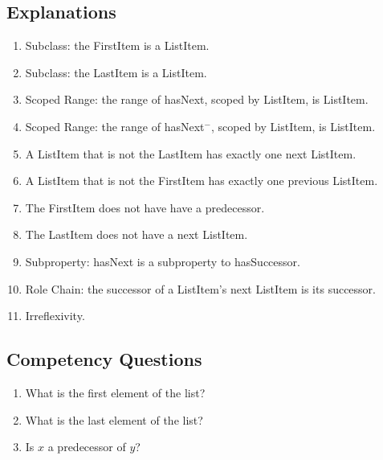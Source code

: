 \subsection{Explanations}
\label{exp:Sequence}
\begin{enumerate}
\item Subclass: the \textsf{FirstItem} is a \textsf{ListItem}.
\item Subclass: the \textsf{LastItem} is a \textsf{ListItem}.
\item Scoped Range: the range of \textsf{hasNext}, scoped by \textsf{ListItem}, is \textsf{ListItem}.
\item Scoped Range: the range of \textsf{hasNext}$^-$, scoped by \textsf{ListItem}, is \textsf{ListItem}.
\item A \textsf{ListItem} that is not the \textsf{LastItem} has exactly one next \textsf{ListItem}.
\item A \textsf{ListItem} that is not the \textsf{FirstItem} has exactly one previous \textsf{ListItem}.
\item The \textsf{FirstItem} does not have have a predecessor.
\item The \textsf{LastItem} does not have a next \textsf{ListItem}.
\item Subproperty: \textsf{hasNext} is a subproperty to \textsf{hasSuccessor}.
\item Role Chain: the successor of a \textsf{ListItem}'s next \textsf{ListItem} is its successor.
\item Irreflexivity.
\end{enumerate}

\subsection{Competency Questions}
\label{cqs:Sequence}
\begin{enumerate}[CQ1.]
\item What is the first element of the list?
\item What is the last element of the list?
\item Is $x$ a predecessor of $y$?
\end{enumerate}

\newpage
